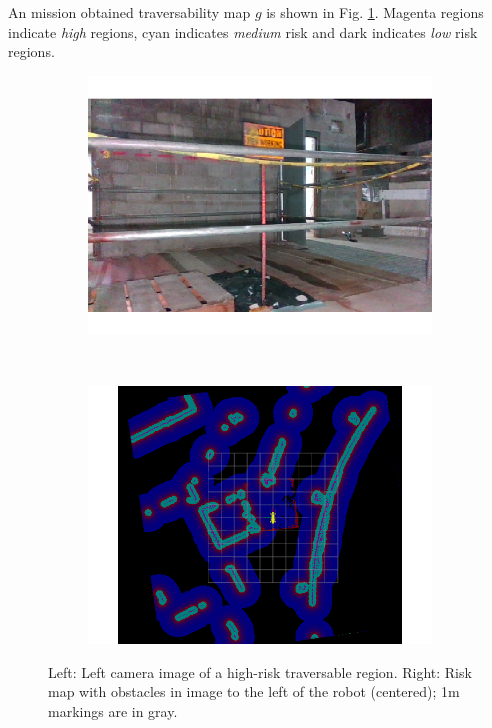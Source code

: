 \documentclass[letterpaper, 10pt, conference]{ieeeconf}      %
\begin{document}
An mission obtained traversability map $g$ is shown in Fig. \ref{global_costmap}. %
Magenta regions indicate \emph{high} regions, cyan indicates \emph{medium} risk and dark indicates \emph{low} risk regions.

\begin{figure}[thpb]
   \centering
    \begin{subfigure}{0.49\linewidth}
        \centering
        \includegraphics[trim={1cm 1cm 0cm 1cm},clip, width=\linewidth]{graphics/costmap_image.png}
    \end{subfigure}%
    ~ 
    \begin{subfigure}{0.49\linewidth}
        \centering
        \includegraphics[trim={1cm 1cm 1cm 2cm},clip,width=\linewidth]{graphics/costmap_large.png}
    \end{subfigure}
    \caption{Left: Left camera image of a high-risk traversable region.  Right:  Risk map with obstacles in image to the left of the robot (centered); 1m markings are in gray.}
    \label{global_costmap}
\end{figure}
\end{document}
